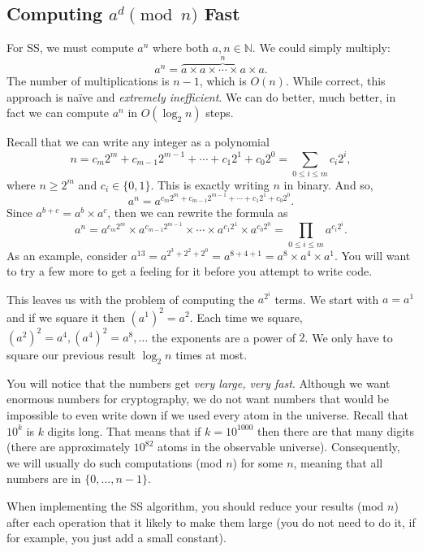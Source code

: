 \subsection{Computing $a^d \pmod{n}$ Fast}
For SS, we must
compute $a^n$ where both $a, n \in \mathbb{N}$.
We could simply multiply:
$$
a^n = \overbrace{a \times a \times \cdots \times a \times a}^n .
$$
The number of multiplications is $n-1$, which is ${O}(n)$.
While correct, this approach is na{\"{i}}ve and \emph{extremely inefficient}.
We can do better, much better, in fact we can compute $a^n$ in ${O} (\log_2 n)$ steps.

Recall that we can write any integer as a polynomial
$$
n
= c_m 2^m + c_{m-1} 2^{m-1} + \cdots + c_1 2^1 + c_0 2^0
= \sum_{0\le i \le m} c_i 2^i ,
$$
where $n \ge 2^m$ and $c_i \in \{0, 1\}$. This is exactly writing $n$ in
binary. And so,
$$
a^n = a^{c_m 2^m + c_{m-1} 2^{m-1} + \cdots + c_1 2^1 + c_0 2^0} .
$$
Since $a^{b+c} = a^b \times a^c$, then we can rewrite the formula as
$$
a^n =
a^{c_m 2^m} \times a^{c_{m-1} 2^{m-1}} \times \cdots \times a^{c_1 2^1} \times a^{c_0 2^0} =
\prod_{0\le i \le m} a^{c_i 2^i} .
$$
As an example, consider
$a^{13} = a^{2^3 + 2^2 + 2^0} = a^{8 + 4 + 1} = a^8 \times a^4 \times a^1$.
You will want to try a few more to get a feeling for it before you attempt to write code.

This leaves us with the problem of computing the $a^{2^i}$ terms.
We start with $a = a^1$ and if we square it then $(a^1)^2 = a^2$. Each time we square,
$(a^2)^2 = a^4, (a^4)^2 = a^8, \ldots$ the exponents are a power of $2$. We only have to square our previous result $\log_2 n$ times at most.

You will notice that the numbers get \emph{very large, very fast}.
Although we want enormous numbers for cryptography, we do not want
numbers that would be impossible to even write down if we used every
atom in the universe. Recall that $10^k$ is $k$ digits long. That
means that if $k=10^{1000}$ then there are that many digits
(there are approximately $10^{82}$ atoms in the observable universe).
Consequently,
we will usually do such computations
(mod ${n}$) for some $n$, meaning that all numbers are in $\{0, \ldots, n-1\}$.

When implementing the SS algorithm, you should reduce your results (mod ${n}$) after each operation that it likely to make them large (you do not need to do it, if for example, you just add a small constant).
